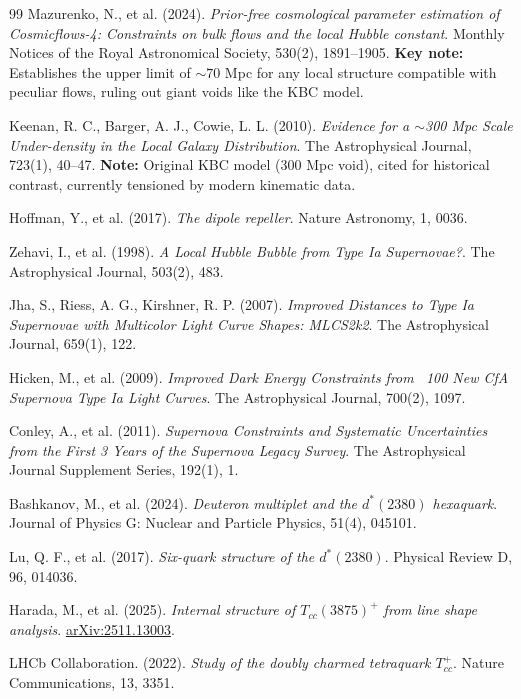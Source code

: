 \documentclass[11pt, a4paper]{article}
\theoremstyle{plain}
\theoremstyle{definition}
\begin{document}
\begin{thebibliography}{99}
Mazurenko, N., et al. (2024). \textit{Prior-free cosmological parameter estimation of Cosmicflows-4: Constraints on bulk flows and the local Hubble constant}. Monthly Notices of the Royal Astronomical Society, 530(2), 1891–1905. 
\textbf{Key note:} Establishes the upper limit of $\sim 70$ Mpc for any local structure compatible with peculiar flows, ruling out giant voids like the KBC model.

Keenan, R. C., Barger, A. J., Cowie, L. L. (2010). \textit{Evidence for a $\sim$300 Mpc Scale Under-density in the Local Galaxy Distribution}. The Astrophysical Journal, 723(1), 40–47. 
\textbf{Note:} Original KBC model (300 Mpc void), cited for historical contrast, currently tensioned by modern kinematic data.

Hoffman, Y., et al. (2017). \textit{The dipole repeller}. Nature Astronomy, 1, 0036.

Zehavi, I., et al. (1998). \textit{A Local Hubble Bubble from Type Ia Supernovae?}. The Astrophysical Journal, 503(2), 483.

Jha, S., Riess, A. G., Kirshner, R. P. (2007). \textit{Improved Distances to Type Ia Supernovae with Multicolor Light Curve Shapes: MLCS2k2}. The Astrophysical Journal, 659(1), 122.

Hicken, M., et al. (2009). \textit{Improved Dark Energy Constraints from ~100 New CfA Supernova Type Ia Light Curves}. The Astrophysical Journal, 700(2), 1097.

Conley, A., et al. (2011). \textit{Supernova Constraints and Systematic Uncertainties from the First 3 Years of the Supernova Legacy Survey}. The Astrophysical Journal Supplement Series, 192(1), 1.

Bashkanov, M., et al. (2024). \textit{Deuteron multiplet and the $d^*(2380)$ hexaquark}. Journal of Physics G: Nuclear and Particle Physics, 51(4), 045101.

Lu, Q. F., et al. (2017). \textit{Six-quark structure of the $d^*(2380)$}. Physical Review D, 96, 014036.

Harada, M., et al. (2025). \textit{Internal structure of $T_{cc}(3875)^+$ from line shape analysis}. \url{arXiv:2511.13003}.

LHCb Collaboration. (2022). \textit{Study of the doubly charmed tetraquark $T_{cc}^+$}. Nature Communications, 13, 3351.


\end{thebibliography}
\end{document}
